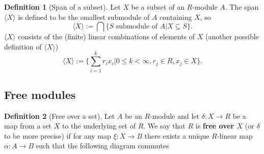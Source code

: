 \documentclass[a4paper,12pt,parskip=half*,chapterprefix=true,numbers=noendperiod]{scrreprt}
\theoremstyle{definition}
\newtheorem{definition}{Definition}[section]
\theoremstyle{remark}
\begin{document}
\begin{definition}[Span of a subset]
	Let $X$ be a subset of an $R$-module $A$. The span $\langle X\rangle$ is defined to be the smallest submodule of $A$ containing $X$, so
	\begin{equation*}
		\langle X\rangle:=\bigcap\{S\text{ submodule of }A|X\subseteq S\}.
	\end{equation*}
	$\langle X\rangle$ consists of the (finite) linear combinations of elements of $X$ (another possible definition of $\langle X\rangle$)
	\begin{equation*}
		\langle X\rangle:=\{\sum_{i=1}^kr_ix_i|0\leq k <\infty, r_j\in R, x_j\in X\}.
	\end{equation*}
\end{definition}


\subsection{Free modules}

\begin{definition}[Free over a set]
	Let $A$ be an $R$-module and let $\delta:X\to R$ be a map from a set $X$ to the underlying set of $R$. We say that $R$ is \textbf{free over $X$} (or $\delta$ to be more precise) if for any map $\xi:X\to B$ there exists a unique $R$-linear map $\alpha:A\to B$ such that the following diagram commutes
	\begin{figure}[H]
		\centering
	\end{figure}
\end{definition}
\end{document}
